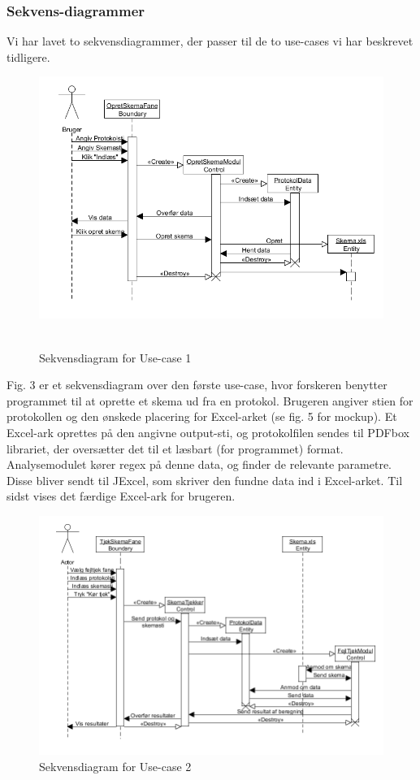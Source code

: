 \documentclass[11pt]{article}
\begin{document}
\subsubsection{Sekvens-diagrammer}
Vi har lavet to sekvensdiagrammer, der passer til de to use-cases vi har beskrevet tidligere.
\begin{figure}[H]
\includegraphics[scale=0.4]{Sekvensdiagram1v3} \hfill \\\\
\caption{Sekvensdiagram for Use-case 1}
\end{figure}
Fig. 3 er et sekvensdiagram over den første use-case, hvor forskeren benytter programmet til at oprette et skema ud fra en protokol. Brugeren angiver stien for protokollen og den ønskede placering for Excel-arket (se fig. 5 for mockup). Et Excel-ark oprettes på den angivne output-sti, og protokolfilen sendes til PDFbox librariet, der oversætter det til et læsbart (for programmet) format. Analysemodulet kører regex på denne data, og finder de relevante parametre. Disse bliver sendt til JExcel, som skriver den fundne data ind i Excel-arket. Til sidst vises det færdige Excel-ark for brugeren.\\
\begin{figure}[H]
\includegraphics[scale=0.4]{Sekvensdiagram2v3}
\caption{Sekvensdiagram for Use-case 2}
\end{figure}
\end{document}
